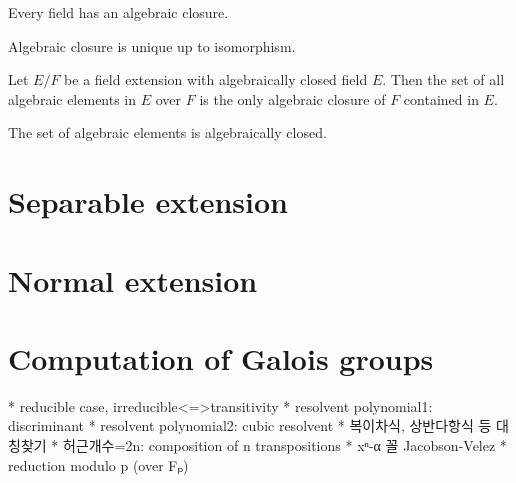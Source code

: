 \documentclass{../exp}
\begin{document}
\begin{thm}
Every field has an algebraic closure.
\end{thm}
\begin{pf}
\end{pf}

\begin{thm}
Algebraic closure is unique up to isomorphism.
\end{thm}
\begin{pf}
\end{pf}

\begin{prop}
Let $E/F$ be a field extension with algebraically closed field $E$.
Then the set of all algebraic elements in $E$ over $F$ is the only algebraic closure of $F$ contained in $E$.
\end{prop}
\begin{pf}
The set of algebraic elements is algebraically closed.
\end{pf}















\section{Separable extension}









\section{Normal extension}







\section{Computation of Galois groups}

 * reducible case, irreducible<=>transitivity
 * resolvent polynomial1: discriminant
 * resolvent polynomial2: cubic resolvent
 * 복이차식, 상반다항식 등 대칭찾기
 * 허근개수=2n: composition of n transpositions
 * xⁿ-α 꼴  Jacobson-Velez
 * reduction modulo p (over Fₚ)
\end{document}
